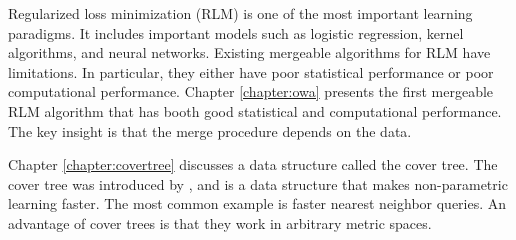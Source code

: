 \documentclass[thesis.tex]{subfiles}
\begin{document}
Regularized loss minimization (RLM) is one of the most important learning paradigms.
It includes important models such as logistic regression, kernel algorithms, and neural networks.
Existing mergeable algorithms for RLM have limitations.
In particular, they either have poor statistical performance or poor computational performance.
Chapter \ref{chapter:owa} presents the first mergeable RLM algorithm that has booth good statistical and computational performance.
The key insight is that the merge procedure depends on the data.

Chapter \ref{chapter:covertree} discusses a data structure called the cover tree.
The cover tree was introduced by \citet{beygelzimer2006cover},
and is a data structure that makes non-parametric learning faster.
The most common example is faster nearest neighbor queries.
An advantage of cover trees is that they work in arbitrary metric spaces.

\end{document}
